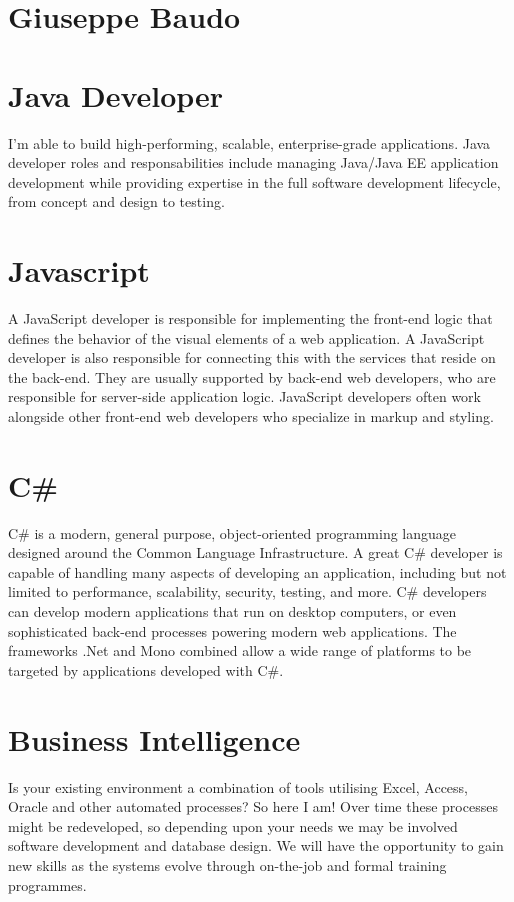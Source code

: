 \documentclass{article}
\begin{document}
	\section*{Giuseppe Baudo}	
	
	\section*{Java Developer}
	I'm able to build high-performing, scalable, enterprise-grade applications.
	Java developer roles and responsabilities include managing Java/Java EE application development while providing expertise in the full software development lifecycle, from concept and design to testing.
	
	
	\section*{Javascript}
	A JavaScript developer is responsible for implementing the front-end logic that defines the behavior of the visual elements of a web application. A JavaScript developer is also responsible for connecting this with the services that reside on the back-end. They are usually supported by back-end web developers, who are responsible for server-side application logic. JavaScript developers often work alongside other front-end web developers who specialize in markup and styling.

	
	\section*{C\#}
	C\# is a modern, general purpose, object-oriented programming language designed around the Common Language Infrastructure. A great C\# developer is capable of handling many aspects of developing an application, including but not limited to performance, scalability, security, testing, and more. C\# developers can develop modern applications that run on desktop computers, or even sophisticated back-end processes powering modern web applications. The frameworks .Net and Mono combined allow a wide range of platforms to be targeted by applications developed with C\#.
	

	\section*{Business Intelligence}
	Is your existing environment a combination of tools utilising Excel, Access, Oracle and other automated processes? So here I am! Over time these processes might be redeveloped, so depending upon your needs we may be involved software development and database design. We will have the opportunity to gain new skills as the systems evolve through on-the-job and formal training programmes.
\end{document}
